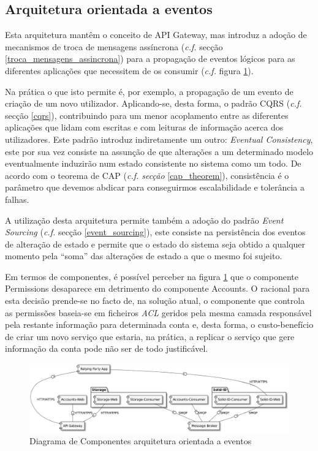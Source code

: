 \subsection{Arquitetura orientada a eventos} \label{subsection:arquitetura_2}

Esta arquitetura mantêm o conceito de API Gateway, mas introduz a adoção de mecanismos de troca de mensagens assíncrona (\emph{c.f.} secção \ref{troca_mensagens_assincrona}) para a propagação de eventos lógicos para as diferentes aplicações que necessitem de os consumir (\emph{c.f.} figura \ref{component_diagram_arquitetura2}).

Na prática o que isto permite é, por exemplo, a propagação de um evento de criação de um novo utilizador. Aplicando-se, desta forma, o padrão CQRS (\emph{c.f.} secção \ref{cqrs}), contribuindo para um menor acoplamento entre as diferentes aplicações que lidam com escritas e com leituras de informação acerca dos utilizadores. Este padrão introduz indiretamente um outro: \emph{Eventual Consistency}, este por sua vez consiste na assunção de que alterações a um determinado modelo eventualmente induzirão num estado consistente no sistema como um todo. De acordo com o teorema de \acrshort{CAP} (\emph{\emph{c.f.} secção} \ref{cap_theorem}), consistência é o parâmetro que devemos abdicar para conseguirmos escalabilidade e tolerância a falhas.

A utilização desta arquitetura permite também a adoção do padrão \emph{Event Sourcing} (\emph{c.f.} secção \ref{event_sourcing}), este consiste na persistência dos eventos de alteração de estado e permite que o estado do sistema seja obtido a qualquer momento pela “soma” das alterações de estado a que o mesmo foi sujeito.

Em termos de componentes, é possível perceber na figura \ref{component_diagram_arquitetura2} que o componente Permissions desaparece em detrimento do componente Accounts. O racional para esta decisão prende-se no facto de, na solução atual, o componente que controla as permissões baseia-se em ficheiros \emph{\acrshort{ACL}} geridos pela mesma camada responsável pela restante informação para determinada conta e, desta forma, o custo-benefício de criar um novo serviço que estaria, na prática, a replicar o serviço que gere informação da conta pode não ser de todo justificável.

\begin{figure}[H]
    \begin{center}
    \includegraphics[width=1 \textwidth]{figures/arquitetura_2_diagrama_componentes.eps}
    \caption{Diagrama de Componentes arquitetura orientada a eventos}
    \label{component_diagram_arquitetura2}
    \end{center}
\end{figure}

